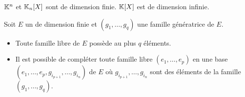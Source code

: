 \documentclass{magnolia}
\begin{document}
\begin{remarqueUnique}
\remarque $\mathbb{K}^n$ et $\polyK[n]$ sont de dimension finie. $\polyK$ est
  de dimension infinie.
\end{remarqueUnique}


\begin{proposition}[utile=2,nom={Lemme de \nom{Steinitz}}]
Soit $E$ un \Kev de dimension finie et $(g_1,\ldots,g_q)$ une famille génératrice de $E$.
\begin{itemize}
\item Toute famille libre de $E$ possède au plus $q$ éléments.
\item Il est possible de compléter toute famille libre $(e_1,\ldots,e_p)$ en une base
$(e_1,\ldots,e_p,g_{i_{p+1}},\ldots,g_{i_n})$ de $E$ où $g_{i_{p+1}},
\ldots,g_{i_n}$ sont des éléments de la famille $(g_1,\ldots,g_q)$.
\end{itemize}

\end{proposition}
\end{document}
